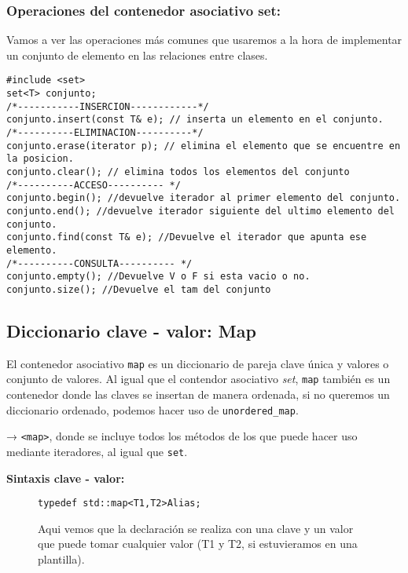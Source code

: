 \subsubsection{Operaciones del contenedor asociativo set:}
Vamos a ver las operaciones más comunes que usaremos a la hora de implementar un conjunto de elemento en las relaciones entre clases.
\begin{center}
  \begin{lstlisting}[frame = single]
#include <set>
set<T> conjunto;
/*-----------INSERCION------------*/
conjunto.insert(const T& e); // inserta un elemento en el conjunto.
/*----------ELIMINACION----------*/
conjunto.erase(iterator p); // elimina el elemento que se encuentre en la posicion.
conjunto.clear(); // elimina todos los elementos del conjunto
/*----------ACCESO---------- */
conjunto.begin(); //devuelve iterador al primer elemento del conjunto.
conjunto.end(); //devuelve iterador siguiente del ultimo elemento del conjunto.
conjunto.find(const T& e); //Devuelve el iterador que apunta ese elemento.
/*----------CONSULTA---------- */
conjunto.empty(); //Devuelve V o F si esta vacio o no.
conjunto.size(); //Devuelve el tam del conjunto
  \end{lstlisting}
\end{center}

\subsection{Diccionario clave - valor: Map}
El contenedor asociativo \texttt{map} es un diccionario de pareja clave única y valores o conjunto de valores.
Al igual que el contendor asociativo \textit{set}, \texttt{map} también es un contenedor donde las claves se insertan de manera ordenada,
si no queremos un diccionario ordenado, podemos hacer uso de \texttt{unordered\_map}.\

 → \texttt{<map>}, donde se incluye todos los métodos de los que puede hacer uso mediante iteradores, al igual que \texttt{set}.

\textbf{\large{Sintaxis clave - valor:}}

\begin{figure}[h]
  \begin{center}
    \begin{lstlisting}[frame=single]
                  typedef std::map<T1,T2>Alias;
    \end{lstlisting}
  \end{center}
  Aqui vemos que la declaración se realiza con una clave y un valor que puede tomar cualquier 
  valor (T1 y T2, si estuvieramos en una plantilla).
\end{figure}


